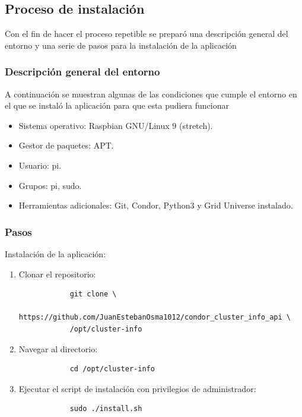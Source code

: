 \subsection{Proceso de instalación}
\noindent

Con el fin de hacer el proceso repetible se preparó una descripción general del entorno y una serie de pasos para la instalación de la aplicación

\subsubsection{Descripción general del entorno}
\noindent
A continuación se muestran algunas de las condiciones que cumple el entorno en el que se instaló la aplicación para que esta pudiera funcionar

\begin{itemize}
	\item Sistema operativo: Raspbian GNU/Linux 9 (stretch).
	\item Gestor de paquetes: APT.
	\item Usuario: pi.
	\item Grupos: pi, sudo.
	\item Herramientas adicionales: Git, Condor, Python3 y Grid Universe instalado.
\end{itemize}

\subsubsection{Pasos}
\noindent

Instalación de la aplicación:

\begin{enumerate}
	\item Clonar el repositorio:
	      \begin{verbatim}
			git clone \
			https://github.com/JuanEstebanOsma1012/condor_cluster_info_api \
			/opt/cluster-info
		\end{verbatim}

	\item Navegar al directorio:
	      \begin{verbatim}
			cd /opt/cluster-info
		\end{verbatim}

	\item Ejecutar el script de instalación con privilegios de administrador:
	      \begin{verbatim}
			sudo ./install.sh
		\end{verbatim}
\end{enumerate}

